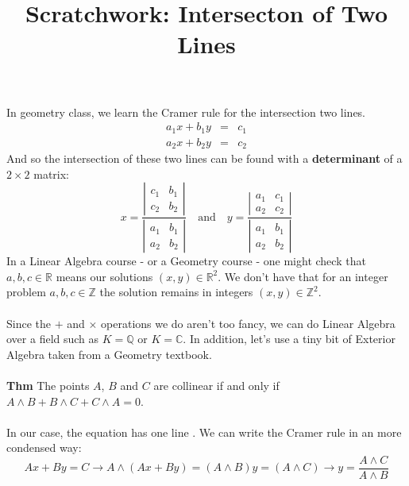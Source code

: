 \documentclass[12pt]{article}
\title{Scratchwork: Intersecton of Two Lines}
\date{}
\begin{document}

\sffamily

\maketitle

\noindent In geometry class, we learn the Cramer rule for the intersection two lines.
\begin{eqnarray*}
a_1 x + b_1 y &=& c_1 \\
a_2 x + b_2 y &=& c_2
\end{eqnarray*}
And so the intersection of these two lines can be found with a \textbf{determinant} of a $2 \times 2$ matrix:
$$ x = \frac{\left|\begin{array}{cc} c_1 & b_1 \\ c_2 & b_2 \end{array} \right|}{\left|\begin{array}{cc} a_1 & b_1 \\ a_2 & b_2 \end{array} \right|} \quad\text{and}\quad 
y = \frac{\left|\begin{array}{cc} a_1 & c_1 \\ a_2 & c_2 \end{array} \right|}{\left|\begin{array}{cc} a_1 & b_1 \\ a_2 & b_2 \end{array} \right|} $$
In a Linear Algebra course - or a Geometry course - one might check that $a,b,c \in \mathbb{R}$ means our solutions $(x,y) \in \mathbb{R}^2$.  We don't have that for an integer problem $a,b,c \in \mathbb{Z}$ the solution remains in integers $(x,y) \in \mathbb{Z}^2$. \\ \\
Since the $+$ and $\times$ operations we do aren't too fancy, we can do Linear Algebra over a field such as $K = \mathbb{Q}$ or $K = \mathbb{C}$.   In addition, let's use a tiny bit of Exterior Algebra taken from a Geometry textbook. \\ \\
\textbf{Thm}
The points $A$, $B$ and $C$ are collinear if and only if $ A \wedge B + B \wedge C + C \wedge A = 0$. \\ \\
In our case, the equation has one line \;.  We can write the Cramer rule in an more condensed way:
$$ Ax + By = C \to A \wedge (Ax + By)  = (A \wedge B) y = (A \wedge C) \to y = \frac{A \wedge C}{A \wedge B} $$
\end{document}
